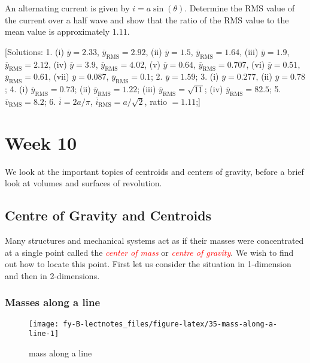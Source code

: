 \documentclass[
  11pt,
  oneside]{book}
\newcommand{\slide}{}
\theoremstyle{definition}
\theoremstyle{definition}
\theoremstyle{definition}
\theoremstyle{definition}
\theoremstyle{remark}
\begin{document}
An alternating current is given by \(i = a\sin(\theta)\). Determine the RMS value of the current over a half wave and show that the ratio of the RMS value to the mean value is approximately \(1.11\).

{[}Solutions:
1. (i) \(\overline{y}=2.33\), \(\overline{y}_{\text{RMS}}=2.92\), (ii) \(\overline{y}=1.5\), \(\overline{y}_{\text{RMS}}=1.64\), (iii) \(\overline{y}=1.9\), \(\overline{y}_{\text{RMS}}=2.12\), (iv) \(\overline{y}=3.9\), \(\overline{y}_{\text{RMS}}=4.02\), (v) \(\overline{y}=0.64\), \(\overline{y}_{\text{RMS}}=0.707\), (vi) \(\overline{y}=0.51\), \(\overline{y}_{\text{RMS}}=0.61\), (vii) \(\overline{y}=0.087\), \(\overline{y}_{\text{RMS}}=0.1\);
2. \(\overline{y}=1.59\);
3. (i) \(\overline{y}=0.277\), (ii) \(\overline{y}=0.78\);
4. (i) \(\overline{y}_{\text{RMS}}=0.73\); (ii) \(\overline{y}_{\text{RMS}}=1.22\); (iii) \(\overline{y}_{\text{RMS}}=\sqrt{11}\); (iv) \(\overline{y}_{\text{RMS}}=82.5\);
5. \(\overline{v}_{\text{RMS}}=8.2\);
6. \(\overline{i}=2a/\pi\), \(\overline{i}_{\text{RMS}}=a/\sqrt{2}\), ratio \(=1.11\);{]}

\chapter{Week 10}\label{week-ten}

We look at the important topics of centroids and centers of gravity, before a brief look at volumes and surfaces of revolution.

\slide

\section{Centre of Gravity and Centroids}\label{centre-of-gravity-and-centroids}

Many structures and mechanical systems act as if their masses were concentrated at a single point called the \textcolor{red}{\em center of mass} or \textcolor{red}{\em centre of gravity}. We wish to find out how to locate this point. First let us consider the situation in 1-dimension and then in 2-dimensions.

\slide

\subsection{Masses along a line}\label{masses-along-a-line}

\begin{figure}

{\centering \texttt{[image: fy-B-lectnotes\_files/figure-latex/35-mass-along-a-line-1]} 

}

\caption{mass along a line}\label{fig:35-mass-along-a-line}
\end{figure}
\end{document}
